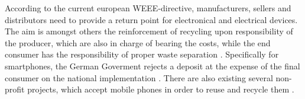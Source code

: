 According to the current european WEEE-directive, manufacturers, sellers and distributors need to provide a return point for electronical and electrical devices. The aim is amongst others the reinforcement of recycling upon responsibility of the producer, which are also in charge of bearing the costs, while the end consumer has the responsibility of proper waste separation \cite{EURLEX}. Specifically for smartphones, the German Goverment rejects a deposit at the expense of the final consumer on the national implementation \cite{BMUB}. There are also existing several non-profit projects, which accept mobile phones in order to reuse and recycle them \cite{NABU}\cite{DUH}.